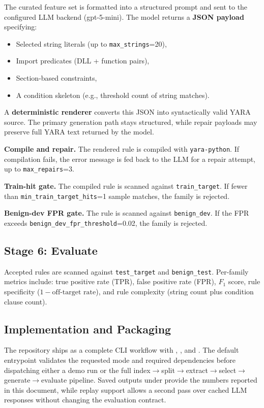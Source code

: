 \documentclass[10pt,twocolumn]{article}
\begin{document}
The curated feature set is formatted into a structured prompt and sent
to the configured LLM backend (gpt-5-mini).  The model returns a
\textbf{JSON payload} specifying:
\begin{itemize}[nosep,leftmargin=1.2em]
  \item Selected string literals (up to \texttt{max\_strings}=20),
  \item Import predicates (DLL + function pairs),
  \item Section-based constraints,
  \item A condition skeleton (e.g., threshold count of string matches).
\end{itemize}

A \textbf{deterministic renderer} converts this JSON into syntactically
valid YARA source.  The primary generation path stays structured, while
repair payloads may preserve full YARA text returned by the model.

\textbf{Compile and repair.}  The rendered rule is compiled with
\texttt{yara-python}.  If compilation fails, the error message is fed
back to the LLM for a repair attempt, up to
\texttt{max\_repairs}=3.

\textbf{Train-hit gate.}  The compiled rule is scanned against
\texttt{train\_target}.  If fewer than \texttt{min\_train\_target\_hits}=1
sample matches, the family is rejected.

\textbf{Benign-dev FPR gate.}  The rule is scanned against
\texttt{benign\_dev}.  If the FPR exceeds
\texttt{benign\_dev\_fpr\_threshold}=0.02, the family is rejected.

\subsection{Stage 6: Evaluate}
Accepted rules are scanned against \texttt{test\_target} and
\texttt{benign\_test}.  Per-family metrics include: true positive rate
(TPR), false positive rate (FPR), $F_1$ score, rule specificity
($1 - \text{off-target rate}$), and rule complexity (string count plus
condition clause count).

\subsection{Implementation and Packaging}
The repository ships as a complete CLI workflow with
, , and .  The
default entrypoint validates the requested mode and required
dependencies before dispatching either a demo run or the full
index$\rightarrow$split$\rightarrow$extract$\rightarrow$select$\rightarrow$generate$\rightarrow$evaluate
pipeline.  Saved outputs under
 provide the numbers reported in this
document, while replay support allows a second pass over cached LLM
responses without changing the evaluation contract.
\end{document}
